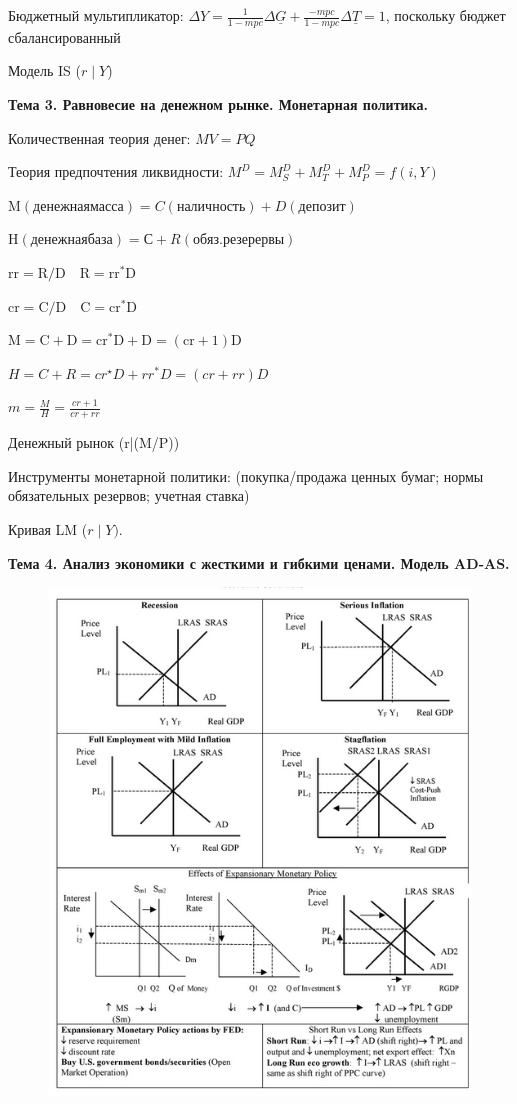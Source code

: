 \documentclass[a4paper,8pt]{article} %
\begin{document}
Бюджетный мультипликатор:  $\Delta Y=\frac{1}{1-m p c} \Delta \underline{G}+\frac{-m p c}{1-m p c} \Delta \underline{T} = 1$, поскольку бюджет сбалансированный

Модель IS ($r \mid Y$)


\textbf{Тема 3. Равновесие на денежном рынке. Монетарная
политика.}

Количественная теория денег: $M V=P Q$

Теория предпочтения ликвидности: $M^{D}=M_{S}^{D}+M_{T}^{D}+M_{P}^{D}=f(i, Y)$



$\mathrm{M} (денежная масса)   =  C (наличность) + D (депозит)$

$\mathrm{H} (денежная база) = С + R (обяз. резерервы)$

$\mathrm{rr}=\mathrm{R} / \mathrm{D} \quad \mathrm{R}=\mathrm{rr}^{*} \mathrm{D}$

$\mathrm{cr}=\mathrm{C} / \mathrm{D} \quad \mathrm{C}=\mathrm{cr}^{*} \mathrm{D}$

$\mathrm{M}=\mathrm{C}+\mathrm{D}=\mathrm{cr}^{*} \mathrm{D}+\mathrm{D}=(\mathrm{cr}+1) \mathrm{D}$

$H=C+R=c r^{\star} D+r r^{*} D=(c r+r r) D$

$m=\frac{M}{H}=\frac{c r+1}{c r+r r}$ 


Денежный рынок (r|(M/P))

Инструменты монетарной политики: (покупка/продажа ценных бумаг;  нормы обязательных резервов; учетная  ставка) 



Кривая LM ($r\mid Y)$.




\textbf{Тема 4. Анализ экономики с жесткими и гибкими ценами. Модель
AD-AS.}


\begin{figure}[h]
	\centering
	\includegraphics[width=0.7\linewidth]{screenshot003}
	\label{fig:screenshot003}
\end{figure}
\end{document}
